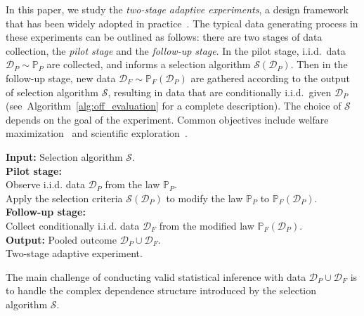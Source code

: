 \documentclass[12pt]{article}
\def\P{\mathbb{P}}
\def\P{\mathbb{P}}
\renewcommand{\P}{\mathbb{P}}							%
\newcommand{\cD}{\mathcal{D}}
\let\oldnl\nl%
\newcommand{\nonl}{\renewcommand{\nl}{\let\nl\oldnl}} %
\begin{document}
In this paper, we study the \textit{two-stage adaptive experiments}, 
a design framework that has been widely adopted in practice~\citep{sampson2005drop,sladek2007genome,sill2009drop,wu2010interval,gasperini2019genome,lin2021inference,kasy2021adaptive,che2023adaptive,schraivogel2023pooled}. 
The typical data generating process in these experiments can be outlined as follows: 
there are two stages of data collection, the \textit{pilot stage} and the \textit{follow-up stage}. 
In the pilot stage, i.i.d.~data $\mathcal{D}_P \sim \P_P$ are collected, and informs a selection algorithm $\mathcal{S}(\mathcal{D}_P)$. 
Then in the follow-up stage, new data $\mathcal{D}_F \sim \P_F(\mathcal{D}_P)$ are gathered according to the output of selection algorithm $\mathcal{S}$, 
resulting in data that are conditionally i.i.d.\ given $\mathcal{D}_P$ (see~Algorithm~\ref{alg:off_evaluation} for a complete description).
The choice of $\mathcal{S}$ depends on the goal of the experiment. Common objectives include welfare maximization~\citep{sampson2005drop,wu2010interval,che2023adaptive} and scientific exploration~\citep{sladek2007genome,gasperini2019genome}.  
\begin{center}
    \begin{minipage}{0.94\linewidth} %
\begin{algorithm}[H]
	\nonl \textbf{Input:} Selection algorithm $\mathcal{S}$. \\
    \nonl \textbf{Pilot stage:} \\
    Observe i.i.d. data $\mathcal{D}_P$ from the law $\P_{P}$. \\
    Apply the selection criteria $\mathcal{S}(\mathcal{D}_P)$ to modify the law $\P_P$ to $\P_F(\cD_P)$. \\
    \nonl \textbf{Follow-up stage:} \\
    Collect conditionally i.i.d. data $\mathcal{D}_F$ from the modified law $\P_F(\mathcal{D}_P)$. \\
    \nonl \textbf{Output:} Pooled outcome $\mathcal{D}_P \cup \mathcal{D}_F$. \\
    \caption{Two-stage adaptive experiment.}
    \label{alg:off_evaluation}
\end{algorithm}
    \end{minipage}
\end{center}

The main challenge of conducting valid statistical inference with data $\mathcal{D}_P \cup \mathcal{D}_F$ is to handle the complex dependence structure introduced by the selection algorithm $\mathcal{S}$. 
\end{document}
